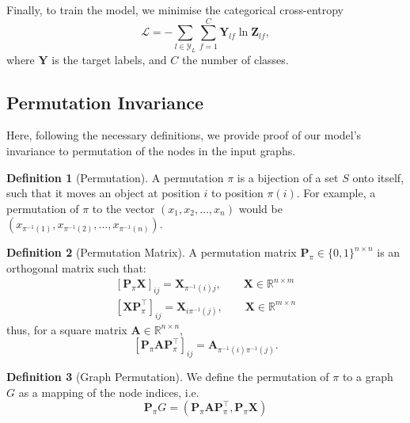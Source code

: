 \documentclass{article}
\renewcommand{\vec}[1]{\mathbf{#1}}
\renewcommand{\P}{\mathbf{P}}
\newcommand{\T}{\top}
\theoremstyle{definition}
\newtheorem{definition}{Definition}[section]
\newcommand{\Real}[1]{\mathbb{R}^{#1}}
\begin{document}
Finally, to train the model, we minimise the categorical cross-entropy
\small
\begin{equation}
  \mathcal{L} = - \sum_{l \in \mathcal{Y}_L} \sum_{f=1}^C \vec{Y}_{lf} \ln \vec{Z}_{lf},
\end{equation}
\normalsize
where $\vec{Y}$ is the target labels, and $C$ the number of classes.

\subsection{Permutation Invariance}

Here, following the necessary definitions, we provide proof of our model's invariance to permutation of the nodes in the input graphs.

\begin{definition}[Permutation]
  A permutation $\pi$ is a bijection of a set $S$ onto itself, such that it moves an object at position $i$ to position $\pi(i)$. For example, a permutation of $\pi$ to the vector $(x_1, x_2, \dots, x_n)$ would be $(x_{\pi^{-1}(1)}, x_{\pi^{-1}(2)}, \dots, x_{\pi^{-1}(n)})$.
\end{definition}

\begin{definition}[Permutation Matrix]
  A permutation matrix $\P_\pi \in \{0, 1\}^{n \times n}$ is an orthogonal matrix such that:
  \begin{align}
    \left[ \P_\pi \vec{X} \right]_{ij} = \vec{X}_{\pi^{-1}(i)j}, \qquad \vec{X} \in \Real{n \times m} \\
    \left[ \vec{X} \P_\pi^\T \right]_{ij} = \vec{X}_{i\pi^{-1}(j)}, \qquad \vec{X} \in \Real{m \times n}
  \end{align}
  thus, for a square matrix $\vec{A} \in \Real{n \times n}$,
  \begin{equation}
    \left[ \P_\pi \vec{A} \P_\pi^\T \right]_{ij} = \vec{A}_{\pi^{-1}(i)\pi^{-1}(j)}.
  \end{equation}
\end{definition}

\begin{definition}[Graph Permutation]
  We define the permutation of $\pi$ to a graph $G$ as a mapping of the node indices, i.e.
  \begin{equation}
    \P_\pi G = (\P_\pi \vec{A} \P_\pi^\T, \P_\pi \vec{X})
  \end{equation}
  \label{def:graphperm}
\end{definition}
\end{document}
